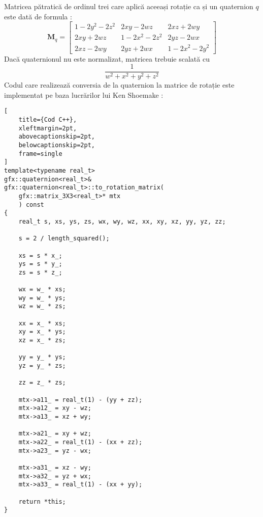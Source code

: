 Matricea pătratică de ordinul trei care aplică aceeași rotație ca și un 
quaternion $q$ este dată de formula :
\begin{equation}
\mathbf{M}_{q} = 
\begin{bmatrix}
1 - 2y^2 - 2z^2 & 2xy - 2wz         & 2xz + 2wy \\
2xy + 2wz       & 1 - 2x^2 - 2z^2   & 2yz - 2wx \\
2xz - 2wy       & 2yz + 2wx         & 1 - 2x^2 - 2y^2
\end{bmatrix}
\end{equation}
Dacă quaternionul nu este normalizat, matricea trebuie scalată cu
\[
\frac{1}{w^2 + x^2 + y^2 + z^2}
\]
Codul care realizează conversia de la quaternion la matrice de rotație este
implementat pe baza lucrărilor lui Ken Shoemake \cite{Shoemake85, Shoemake89} :
\begin{lstlisting}[
    title={Cod C++}, 
    xleftmargin=2pt,
    abovecaptionskip=2pt,
    belowcaptionskip=2pt,
    frame=single
]
template<typename real_t>
gfx::quaternion<real_t>&
gfx::quaternion<real_t>::to_rotation_matrix(
    gfx::matrix_3X3<real_t>* mtx
    ) const
{
    real_t s, xs, ys, zs, wx, wy, wz, xx, xy, xz, yy, yz, zz;

    s = 2 / length_squared();

    xs = s * x_;
    ys = s * y_;
    zs = s * z_;

    wx = w_ * xs;
    wy = w_ * ys;
    wz = w_ * zs;

    xx = x_ * xs;
    xy = x_ * ys;
    xz = x_ * zs;

    yy = y_ * ys;
    yz = y_ * zs;

    zz = z_ * zs;

    mtx->a11_ = real_t(1) - (yy + zz);
    mtx->a12_ = xy - wz;
    mtx->a13_ = xz + wy;

    mtx->a21_ = xy + wz;
    mtx->a22_ = real_t(1) - (xx + zz);
    mtx->a23_ = yz - wx;

    mtx->a31_ = xz - wy;
    mtx->a32_ = yz + wx;
    mtx->a33_ = real_t(1) - (xx + yy);

    return *this;
}
\end{lstlisting}

